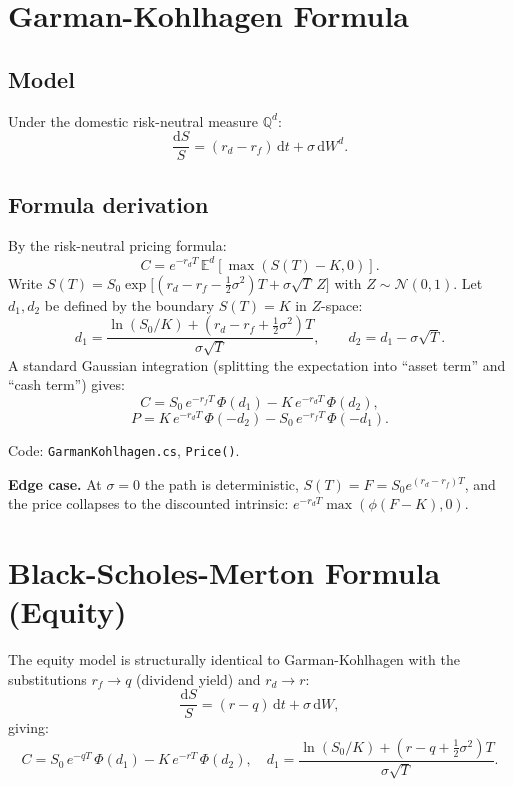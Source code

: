 \documentclass[11pt,a4paper]{article}
\newcommand{\dd}{\mathrm{d}}
\newcommand{\E}{\mathbb{E}}
\newcommand{\Qd}{\mathbb{Q}^d}
\newcommand{\N}{\mathcal{N}}
\newcommand{\coderef}[1]{\texttt{\color{blue!60!black}#1}}
\theoremstyle{definition}
\begin{document}
\section{Garman-Kohlhagen Formula}
\label{sec:gk}

\subsection{Model}

Under the domestic risk-neutral measure $\Qd$:
\[
  \frac{\dd S}{S} = (r_d - r_f)\,\dd t + \sigma\,\dd W^d.
\]

\subsection{Formula derivation}

By the risk-neutral pricing formula:
\[
  C = e^{-r_d T}\,\E^d[\max(S(T)-K,0)].
\]
Write $S(T)=S_0\exp\bigl[(r_d-r_f-\tfrac{1}{2}\sigma^2)T+\sigma\sqrt{T}\,Z\bigr]$ with $Z\sim\N(0,1)$.
Let $d_1,d_2$ be defined by the boundary $S(T)=K$ in $Z$-space:
\[
  d_1 = \frac{\ln(S_0/K)+(r_d-r_f+\tfrac{1}{2}\sigma^2)T}{\sigma\sqrt{T}},
  \qquad d_2 = d_1 - \sigma\sqrt{T}.
\]
A standard Gaussian integration (splitting the expectation into
``asset term'' and ``cash term'') gives:
\[
  \boxed{C = S_0\,e^{-r_f T}\,\Phi(d_1) - K\,e^{-r_d T}\,\Phi(d_2),}
\]
\[
  P = K\,e^{-r_d T}\,\Phi(-d_2) - S_0\,e^{-r_f T}\,\Phi(-d_1).
\]

Code: \coderef{GarmanKohlhagen.cs}, \texttt{Price()}.

\textbf{Edge case.} At $\sigma=0$ the path is deterministic, $S(T)=F=S_0e^{(r_d-r_f)T}$,
and the price collapses to the discounted intrinsic:
$e^{-r_d T}\max(\phi(F-K),0)$.

\section{Black-Scholes-Merton Formula (Equity)}
\label{sec:bsm}

The equity model is structurally identical to Garman-Kohlhagen with the
substitutions $r_f\to q$ (dividend yield) and $r_d\to r$:
\[
  \frac{\dd S}{S} = (r - q)\,\dd t + \sigma\,\dd W,
\]
giving:
\[
  C = S_0\,e^{-qT}\,\Phi(d_1) - K\,e^{-rT}\,\Phi(d_2),
  \quad d_1=\frac{\ln(S_0/K)+(r-q+\tfrac{1}{2}\sigma^2)T}{\sigma\sqrt{T}}.
\]
\end{document}
